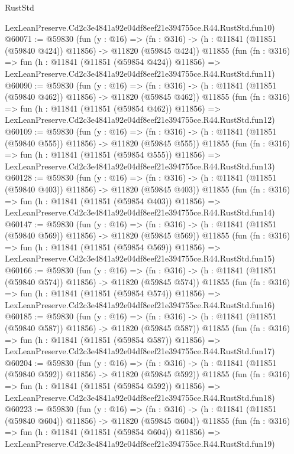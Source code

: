\begin{lexlean}{RustStd}
\begin{coremodule}
    LexLeanPreserve.Cd2c3e4841a92e04df8eef21e394755ce.R44.RustStd.fun10)
@60071 := @59830
    (fun (y : @16) =>
    (fn : @316) -> (h : @11841 (@11851 (@59840 @424)) @11856) -> @11820 (@59845 @424))
    @11855
    (fun (fn : @316) =>
    fun (h : @11841 (@11851 (@59854 @424)) @11856) =>
    LexLeanPreserve.Cd2c3e4841a92e04df8eef21e394755ce.R44.RustStd.fun11)
@60090 := @59830
    (fun (y : @16) =>
    (fn : @316) -> (h : @11841 (@11851 (@59840 @462)) @11856) -> @11820 (@59845 @462))
    @11855
    (fun (fn : @316) =>
    fun (h : @11841 (@11851 (@59854 @462)) @11856) =>
    LexLeanPreserve.Cd2c3e4841a92e04df8eef21e394755ce.R44.RustStd.fun12)
@60109 := @59830
    (fun (y : @16) =>
    (fn : @316) -> (h : @11841 (@11851 (@59840 @555)) @11856) -> @11820 (@59845 @555))
    @11855
    (fun (fn : @316) =>
    fun (h : @11841 (@11851 (@59854 @555)) @11856) =>
    LexLeanPreserve.Cd2c3e4841a92e04df8eef21e394755ce.R44.RustStd.fun13)
@60128 := @59830
    (fun (y : @16) =>
    (fn : @316) -> (h : @11841 (@11851 (@59840 @403)) @11856) -> @11820 (@59845 @403))
    @11855
    (fun (fn : @316) =>
    fun (h : @11841 (@11851 (@59854 @403)) @11856) =>
    LexLeanPreserve.Cd2c3e4841a92e04df8eef21e394755ce.R44.RustStd.fun14)
@60147 := @59830
    (fun (y : @16) =>
    (fn : @316) -> (h : @11841 (@11851 (@59840 @569)) @11856) -> @11820 (@59845 @569))
    @11855
    (fun (fn : @316) =>
    fun (h : @11841 (@11851 (@59854 @569)) @11856) =>
    LexLeanPreserve.Cd2c3e4841a92e04df8eef21e394755ce.R44.RustStd.fun15)
@60166 := @59830
    (fun (y : @16) =>
    (fn : @316) -> (h : @11841 (@11851 (@59840 @574)) @11856) -> @11820 (@59845 @574))
    @11855
    (fun (fn : @316) =>
    fun (h : @11841 (@11851 (@59854 @574)) @11856) =>
    LexLeanPreserve.Cd2c3e4841a92e04df8eef21e394755ce.R44.RustStd.fun16)
@60185 := @59830
    (fun (y : @16) =>
    (fn : @316) -> (h : @11841 (@11851 (@59840 @587)) @11856) -> @11820 (@59845 @587))
    @11855
    (fun (fn : @316) =>
    fun (h : @11841 (@11851 (@59854 @587)) @11856) =>
    LexLeanPreserve.Cd2c3e4841a92e04df8eef21e394755ce.R44.RustStd.fun17)
@60204 := @59830
    (fun (y : @16) =>
    (fn : @316) -> (h : @11841 (@11851 (@59840 @592)) @11856) -> @11820 (@59845 @592))
    @11855
    (fun (fn : @316) =>
    fun (h : @11841 (@11851 (@59854 @592)) @11856) =>
    LexLeanPreserve.Cd2c3e4841a92e04df8eef21e394755ce.R44.RustStd.fun18)
@60223 := @59830
    (fun (y : @16) =>
    (fn : @316) -> (h : @11841 (@11851 (@59840 @604)) @11856) -> @11820 (@59845 @604))
    @11855
    (fun (fn : @316) =>
    fun (h : @11841 (@11851 (@59854 @604)) @11856) =>
    LexLeanPreserve.Cd2c3e4841a92e04df8eef21e394755ce.R44.RustStd.fun19)

\end{coremodule}
\end{lexlean}
